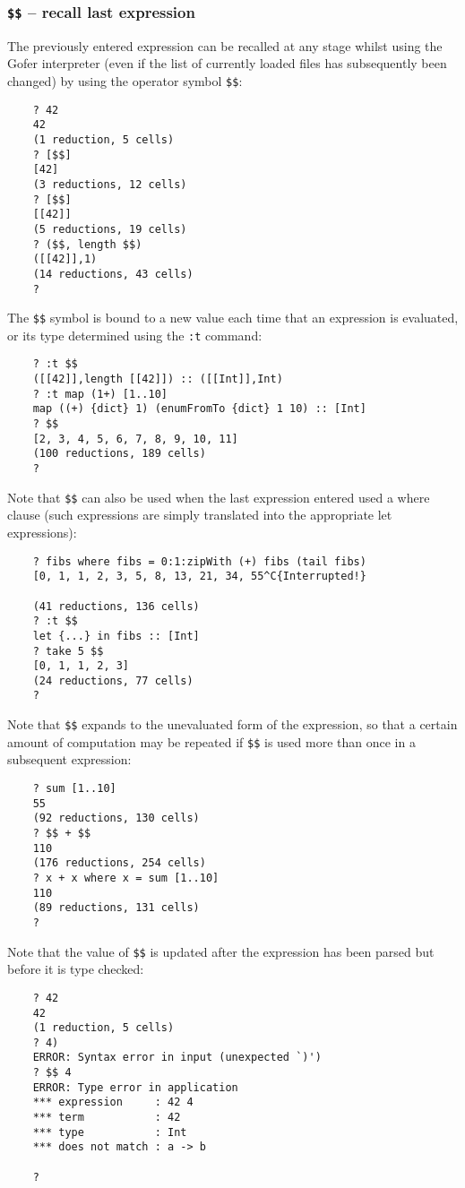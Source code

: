 \subsubsection{{\tt \$\$} -- recall last expression}
The previously entered expression can be recalled at any stage whilst
using the Gofer interpreter (even if the list of currently loaded files
has subsequently been changed) by using the operator symbol \verb"$$":
\begin{verbatim}
    ? 42
    42
    (1 reduction, 5 cells)
    ? [$$]
    [42]
    (3 reductions, 12 cells)
    ? [$$]
    [[42]]
    (5 reductions, 19 cells)
    ? ($$, length $$)
    ([[42]],1)
    (14 reductions, 43 cells)
    ?
\end{verbatim}
The \verb"$$" symbol is bound to a new value each time that an expression is
evaluated, or its type determined using the \verb":t" command:
\begin{verbatim}
    ? :t $$
    ([[42]],length [[42]]) :: ([[Int]],Int)
    ? :t map (1+) [1..10]
    map ((+) {dict} 1) (enumFromTo {dict} 1 10) :: [Int]
    ? $$
    [2, 3, 4, 5, 6, 7, 8, 9, 10, 11]
    (100 reductions, 189 cells)
    ?
\end{verbatim}
Note that \verb"$$" can also be used when the last expression entered used
a where clause (such expressions are simply translated into the
appropriate let expressions):
\begin{verbatim}
    ? fibs where fibs = 0:1:zipWith (+) fibs (tail fibs)
    [0, 1, 1, 2, 3, 5, 8, 13, 21, 34, 55^C{Interrupted!}

    (41 reductions, 136 cells)
    ? :t $$
    let {...} in fibs :: [Int]
    ? take 5 $$
    [0, 1, 1, 2, 3]
    (24 reductions, 77 cells)
    ?
\end{verbatim}
Note that \verb"$$" expands to the unevaluated form of the expression, so that
a certain amount of computation may be repeated if \verb"$$" is used more than
once in a subsequent expression:
\begin{verbatim}
    ? sum [1..10]
    55
    (92 reductions, 130 cells)
    ? $$ + $$
    110
    (176 reductions, 254 cells)
    ? x + x where x = sum [1..10]
    110
    (89 reductions, 131 cells)
    ?
\end{verbatim}
Note that the value of \verb"$$" is updated after the expression has been parsed
but before it is type checked:
\begin{verbatim}
    ? 42
    42
    (1 reduction, 5 cells)
    ? 4)
    ERROR: Syntax error in input (unexpected `)')
    ? $$ 4
    ERROR: Type error in application
    *** expression     : 42 4
    *** term           : 42
    *** type           : Int
    *** does not match : a -> b

    ?
\end{verbatim}

